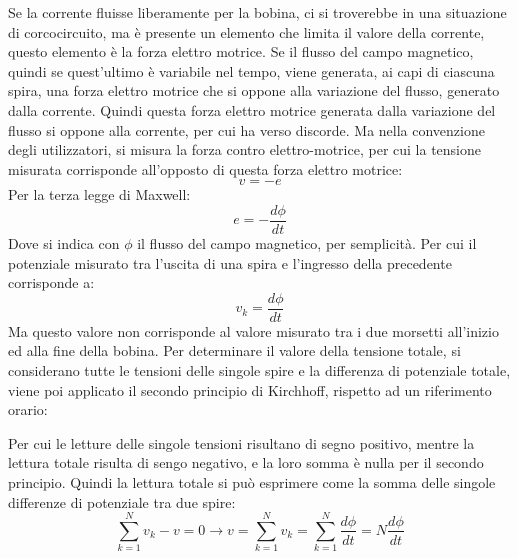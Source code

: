 \documentclass{article}
\numberwithin{equation}{subsection}
\begin{document}
Se la corrente fluisse liberamente per la bobina, ci si troverebbe in una situazione di corcocircuito, ma è presente un elemento che limita il valore della corrente, questo 
elemento è la forza elettro motrice. 
Se il flusso del campo magnetico, quindi se quest'ultimo è variabile nel tempo, viene generata, ai capi di ciascuna spira, una forza elettro motrice che si oppone alla variazione 
del flusso, generato dalla corrente. Quindi questa forza elettro motrice generata dalla variazione del flusso si oppone alla corrente, per cui ha verso discorde. Ma nella 
convenzione degli utilizzatori, si misura la forza contro elettro-motrice, per cui la tensione misurata corrisponde all'opposto di questa forza elettro motrice: 
\begin{equation*}
    v=-e
\end{equation*}
Per la terza legge di Maxwell:
\begin{equation*}
    e=-\displaystyle\frac{d\phi}{dt}
\end{equation*}
Dove si indica con $\phi$ il flusso del campo magnetico, per semplicità. Per cui il potenziale misurato tra l'uscita di una spira e l'ingresso della precedente corrisponde a:
\begin{equation*}
    v_k=\displaystyle\frac{d\phi}{dt}
\end{equation*}
Ma questo valore non corrisponde al valore misurato tra i due morsetti all'inizio ed alla fine della bobina. Per determinare il valore della tensione totale, si considerano 
tutte le tensioni delle singole spire e la differenza di potenziale totale, viene poi applicato il secondo principio di Kirchhoff, rispetto ad un riferimento orario:
\begin{center}
\end{center}
Per cui le letture delle singole tensioni risultano di segno positivo, mentre la lettura totale risulta di sengo negativo, e la loro somma è nulla per il secondo principio. 
Quindi la lettura totale si può esprimere come la somma delle singole differenze di potenziale tra due spire:
\begin{equation*}
    \displaystyle\sum_{k=1}^Nv_k-v=0\to v=\sum_{k=1}^Nv_k=\sum_{k=1}^N\frac{d\phi}{dt}=N\frac{d\phi}{dt}
\end{equation*}
\end{document}
